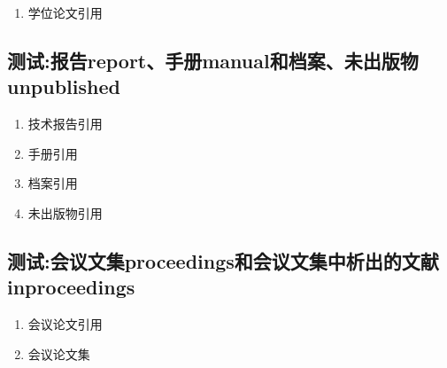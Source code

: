 \begin{refsection}
\begin{enumerate}
  \item 学位论文引用\cite{CALMS1965--,马欢2011-27-27,吴云芳2003--,张若凌2004--,张志祥1998--}
\end{enumerate}

\printbibliography[heading=bibliography,title=【硕博士论文】]
\end{refsection}


\subsection{测试:报告report、手册manual和档案、未出版物unpublished}

\begin{refsection}
\begin{enumerate}
  \item 技术报告引用
  \cite{Calkin2011-8-9,Eggrers--,Humphrey1971--,DTFHA1990--,WHO1970--,汤万金2013-09-30--,中华人民共和国国务院新闻办公室2013-04-16--}
  \item 手册引用
  \cite{Lehman2013--,Lehman2015,Mittelbach2015--,Oetiker2011--,Robertson2011--,Sommerfeldt2011--,Umeki2010--,胡振震2016,吴凌云2007--}
  \item 档案引用\cite{中国第一历史档案馆2001--}
  \item 未出版物引用\cite{包太雷2013--}
\end{enumerate}

\printbibliography[heading=bibliography,title=【报告、手册和档案、未出版物】]
\end{refsection}


\subsection{测试:会议文集proceedings和会议文集中析出的文献inproceedings}

\begin{refsection}
\begin{enumerate}
  \item 会议论文引用\cite{韩吉人1985-90-99,FOURNEY1971-17-38,FOURNEY1971-17-38a,Nemec1997-209-214,贾东琴2011-45-52,裴丽生1981-2-10,汪学军2002-22-25,张忠智1997-33-34}
      \cite{Choi2002-1075-1080,Dardari2002-201-206,Firoozbakhsh2003-473-477,Foerster2002-1931-1935,
      Fontana2002-309-313,Giorgetti2005-794-798,Giorgetti2006--,Li2004-21-24,Nasri2008-3616-3621,Piazzo2001--}
  \item 会议论文集\cite{陈志勇2011--,雷光春2012--,ROSENTHALL1963--,GANZHA2000--,Babu2014--,中国力学学会1999--,中国社会科学院台湾史研究中心2012--}
\end{enumerate}

\printbibliography[heading=bibliography,title=【会议文集和论文】]
\end{refsection}

